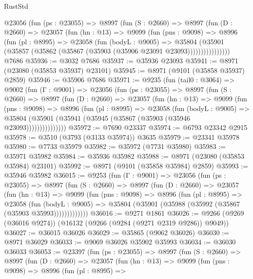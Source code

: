 \begin{lexlean}{RustStd}
\begin{coremodule}
        @23056
          (fun (ps : @23055) =>
          @8997
            (fun (S : @2660) =>
            @8997
              (fun (D : @2660) =>
              @23057
                (fun (hn : @13) =>
                @9099
                  (fun (pns : @9098) =>
                  @8996
                    (fun (pl : @8995) =>
                    @23058
                      (fun (bodyL : @9005) =>
                      @35804
                        (@35901
                          (@35857 (@35862 (@35867 (@35903 (@35906 @23091 @23093))))))))))))))))
    @7686
@35936 := @3032 @7686
@35937 := @35936 @23093
@35941 := @8971 (@23080 (@35853 @35937) @23101)
@35945 := @8971 (@9101 (@35858 @35937) @2859)
@35946 := @35906 @7686
@35971 := @9235
    (fun (tail0 : @3064) =>
    @9002
      (fun (Γ : @9001) =>
      @23056
        (fun (ps : @23055) =>
        @8997
          (fun (S : @2660) =>
          @8997
            (fun (D : @2660) =>
            @23057
              (fun (hn : @13) =>
              @9099
                (fun (pns : @9098) =>
                @8996
                  (fun (pl : @8995) =>
                  @23058
                    (fun (bodyL : @9005) =>
                    @35804 (@35901 (@35941 (@35945 (@35867 (@35903 (@35946 @23093)))))))))))))))
@35972 := @7690 @23337
@35974 := @6793 @23342 @2915
@35978 := @3510 (@3793 (@3133 @35974)) @3635
@35979 := @23341 @35978
@35980 := @7733 @35979
@35982 := @35972 (@7731 @35980)
@35983 := @35971 @35982
@35984 := @35936 @35982
@35988 := @8971 (@23080 (@35853 @35984) @23101)
@35992 := @8971 (@9101 (@35858 @35984) @2859)
@35993 := @35946 @35982
@36015 := @9253
    (fun (Γ : @9001) =>
    @23056
      (fun (ps : @23055) =>
      @8997
        (fun (S : @2660) =>
        @8997
          (fun (D : @2660) =>
          @23057
            (fun (hn : @13) =>
            @9099
              (fun (pns : @9098) =>
              @8996
                (fun (pl : @8995) =>
                @23058
                  (fun (bodyL : @9005) =>
                  @35804 (@35901 (@35988 (@35992 (@35867 (@35903 @35993)))))))))))))
@36016 := @9271 @1861
@36026 := @9266 (@9269 (@36016 @9274)) (@16132 (@9266 (@9284 (@9271 @2319 @9286)) @9049))
@36027 := @36015 @36026
@36029 := @35865 (@9062 @36026)
@36030 := @8971 @36029
@36033 := @9069 @36026 @35902 @35993
@36034 := @36030 @36033
@36053 := @23397
    (fun (ps : @23055) =>
    @8997
      (fun (S : @2660) =>
      @8997
        (fun (D : @2660) =>
        @23057
          (fun (hn : @13) =>
          @9099
            (fun (pns : @9098) =>
            @8996
              (fun (pl : @8995) =>

\end{coremodule}
\end{lexlean}
